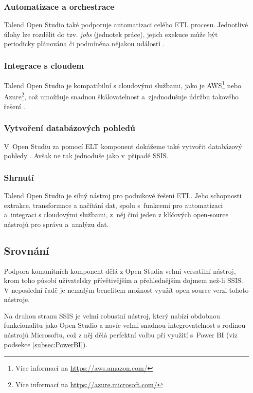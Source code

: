 \subsubsection{Automatizace a orchestrace}
Talend Open Studio také podporuje automatizaci celého ETL procesu.
Jednotlivé úlohy lze rozdělit do tzv. \textit{jobs} (jednotek práce), jejich exekuce může být periodicky plánována či podmíněna nějakou událostí \cite{TalendBuildingJobs:online}.

\subsubsection{Integrace s cloudem}
Talend Open Studio je kompatibilní s cloudovými službami, jako je AWS\footnote{Více informací na \url{https://aws.amazon.com/}} nebo Azure\footnote{Více informací na \url{https://azure.microsoft.com/}}, což umožňuje snadnou škálovatelnost a~zjednodušuje údržbu takového řešení \cite{TalendCloudInte:online}.

\subsubsection{Vytvoření databázových pohledů}
V~Open Studiu za pomocí ELT komponent dokážeme také vytvořit databázový pohledy \cite{TalendETL:online}.
Avšak ne tak jednoduše jako v~případě SSIS.

\subsubsection{Shrnutí}
Talend Open Studio je silný nástroj pro podnikové řešení ETL. Jeho schopnosti extrakce, transformace a načítání dat, spolu s~funkcemi pro automatizaci a~integraci s cloudovými službami, z~něj činí jeden z klíčových open-source nástrojů pro správu a~analýzu dat.

\subsection{Srovnání}\label{subsec:DataIntegComparison}
Podpora komunitních komponent dělá z Open Studia velmi versatilní nástroj, krom toho působí uživatelsky přívětivějším a přehlednějším dojmem než-li SSIS.
V neposlední řadě je nemalým benefitem možnost využít open-source verzi tohoto nástroje.

Na druhou stranu SSIS je velmi robustní nástroj, který nabízí obdobnou funkcionalitu jako Open Studio a navíc velmi snadnou integrovatelnost s rodinou nástrojů Microsoftu, což z něj dělá perfektní volbu při využití s~Power BI (viz podsekce \ref{subsec:PowerBI}).

